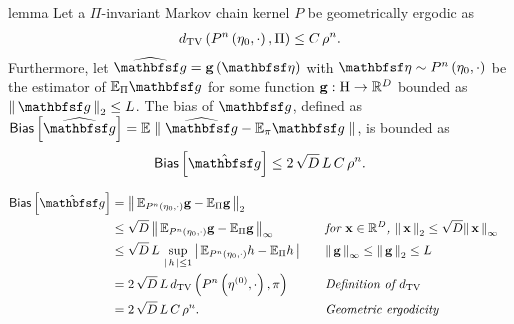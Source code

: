 \begin{theoremEnd}{lemma}\label{thm:mcmc_bias}
  Let a \(\Pi\)-invariant Markov chain kernel \(P\) be geometrically ergodic as
  \begin{align*}
    {d_{\mathrm{TV}}\left(P^{n}\left(\mathbf{\eta}_0, \cdot\right),  \Pi \right)} \leq C \, \rho^{n}.
  \end{align*}
  Furthermore, let \(\widehat{\rvvg} = \vg\left(\rvveta\right)\) with \(\rvveta \sim P^n\left(\veta_0, \cdot\right)\) be the estimator of \(\mathbb{E}_{\Pi}\rvvg\) for some function \(\mathbf{g} : \mathrm{H} \rightarrow \mathbb{R}^{D}\) bounded as \( \norm{\rvvg}_{2} \leq L \).
  The bias of \(\rvvg\), defined as
  \(
    \mathsf{Bias}\left[ \widehat{\rvvg} \right] = \mathbb{E}\parallel \widehat{\rvvg} - \mathbb{E}_{\pi}\rvvg \parallel
  \),
  is bounded as
  \begin{alignat*}{2}
    \mathsf{Bias}\left[ \hat{\rvvg} \right]
    \leq
    2 \, \sqrt{D} \, L \, C \, \rho^{n}.
  \end{alignat*}
\end{theoremEnd}
\begin{proofEnd}
  \begin{alignat}{2}
    \mathsf{Bias}\left[ \hat{\rvvg} \right]
    &=
    \norm{
      \mathbb{E}_{P^n\left(\veta_0, \cdot\right)}\vg
      -
      \mathbb{E}_{\Pi}\vg
    }_2
    \nonumber
    \\
    &\leq
    \sqrt{D}\,\norm{
      \mathbb{E}_{P^n\left(\veta_0, \cdot\right)}\vg
      -
      \mathbb{E}_{\Pi}\vg
    }_{\infty}
    &&\quad\text{\textit{for  \(\vx \in \mathbb{R}^D\), \(\norm{\vx}_2 \leq \sqrt{D}\norm{\vx}_{\infty}\)}}
    \nonumber
    \\
    &\leq
    \sqrt{D}\,L\,\sup_{\abs{h} \leq 1}
    \abs{
      \mathbb{E}_{P^n\left(\veta_0, \cdot\right)}h
      -
      \mathbb{E}_{\Pi}h
    }
    &&\quad\text{\textit{\(\norm{\vg}_{\infty} \leq \norm{\vg}_2 \leq L\)}}
    \nonumber
    \\
    &=
    2 \,  \sqrt{D} \, L \,
    \DTV{P^{n}\left(\veta^{(0)}, \cdot\right)}{\pi}
    &&\quad\text{\textit{Definition of \(d_{\mathrm{TV}}\)}}
    \nonumber
    \\
    &=
    2 \, \sqrt{D} \, L \, C \, \rho^{n}.
    &&\quad\text{\textit{Geometric ergodicity}}
    \nonumber
  \end{alignat}
\end{proofEnd}


